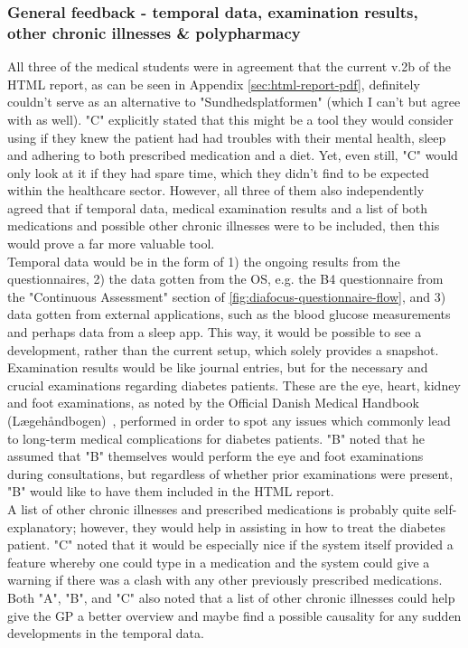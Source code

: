 \subsubsection*{General feedback - temporal data, examination results, other chronic illnesses \& polypharmacy}
All three of the medical students were in agreement that the current v.2b of the HTML report, as can be seen in Appendix \autoref{sec:html-report-pdf}, definitely couldn't serve as an alternative to "Sundhedsplatformen" (which I can't but agree with as well). "C" explicitly stated that this might be a tool they would consider using if they knew the patient had had troubles with their mental health, sleep and adhering to both prescribed medication and a diet. Yet, even still, "C" would only look at it if they had spare time, which they didn't find to be expected within the healthcare sector. However, all three of them also independently agreed that if temporal data, medical examination results and a list of both medications and possible other chronic illnesses were to be included, then this would prove a far more valuable tool.
\\
Temporal data would be in the form of 1) the ongoing results from the questionnaires, 2) the data gotten from the OS, e.g. the B4 questionnaire from the "Continuous Assessment" section of \autoref{fig:diafocus-questionnaire-flow}, and 3) data gotten from external applications, such as the blood glucose measurements and perhaps data from a sleep app. This way, it would be possible to see a development, rather than the current setup, which solely provides a snapshot.
\\
Examination results would be like journal entries, but for the necessary and crucial examinations regarding diabetes patients. These are the eye, heart, kidney and foot examinations, as noted by the Official Danish Medical Handbook (Lægehåndbogen)~\cite{SundhedDK-diabetes}, performed in order to spot any issues which commonly lead to long-term medical complications for diabetes patients. "B" noted that he assumed that "B" themselves would perform the eye and foot examinations during consultations, but regardless of whether prior examinations were present, "B" would like to have them included in the HTML report.
\\
A list of other chronic illnesses and prescribed medications is probably quite self-explanatory; however, they would help in assisting in how to treat the diabetes patient. "C" noted that it would be especially nice if the system itself provided a feature whereby one could type in a medication and the system could give a warning if there was a clash with any other previously prescribed medications. Both "A", "B", and "C" also noted that a list of other chronic illnesses could help give the GP a better overview and maybe find a possible causality for any sudden developments in the temporal data.


